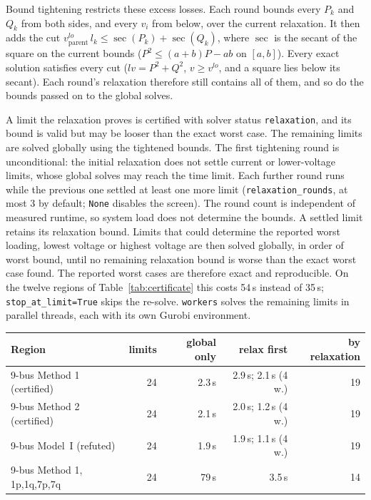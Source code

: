 \documentclass[11pt,a4paper]{report}
\newcommand{\code}[1]{\texttt{\small #1}}
\begin{document}
Bound tightening restricts these excess losses. Each round bounds every $P_k$ and $Q_k$
from both sides, and every $v_i$ from below, over the current relaxation. It
then adds the cut $v^{lo}_{\mathrm{parent}}\, l_k \le \sec(P_k) + \sec(Q_k)$,
where $\sec$ is the secant of the square on the current bounds
($P^2 \le (a{+}b)P - ab$ on $[a, b]$). Every exact solution satisfies every cut
($l v = P^2 + Q^2$, $v \ge v^{lo}$, and a square lies below its secant). Each
round's relaxation therefore still contains all of them, and so do the bounds
passed on to the global solves.

A limit the relaxation proves is certified with solver status
\code{relaxation}, and its bound is valid but may be looser than the exact
worst case. The remaining limits are solved globally using the tightened
bounds. The first tightening round is unconditional: the initial relaxation
does not settle current or lower-voltage limits, whose global solves may
reach the time limit. Each further round runs while the previous one settled at
least one more limit (\code{relaxation\_rounds}, at most 3 by default;
\code{None} disables the screen). The round count is independent of measured
runtime, so system load does not determine the bounds. A settled limit retains
its relaxation bound. Limits that could determine the reported worst loading,
lowest voltage or highest voltage are then solved globally, in order of worst
bound, until no remaining relaxation
bound is worse than the exact worst case found. The reported worst cases are
therefore exact and reproducible. On the twelve
regions of Table~\ref{tab:certificate} this costs 54\,s instead of 35\,s; \code{stop\_at\_limit=True}
skips the re-solve. \code{workers} solves the remaining limits
in parallel threads, each with its own Gurobi environment.

\begin{center}\small
\begin{tabular}{@{}lrrrr@{}}
\toprule
Region & limits & global only & relax first & by relaxation \\
\midrule
9-bus Method 1 (certified)     & 24  & 2.3\,s & 2.9\,s; 2.1\,s (4 w.)  & 19 \\
9-bus Method 2 (certified)     & 24  & 2.1\,s & 2.0\,s; 1.2\,s (4 w.)  & 19 \\
9-bus Model~I (refuted)        & 24  & 1.9\,s & 1.9\,s; 1.1\,s (4 w.)  & 19 \\
9-bus Method 1, 1p,1q,7p,7q    & 24  & 79\,s  & 3.5\,s                  & 14 \\
\bottomrule
\end{tabular}
\end{center}
\end{document}
